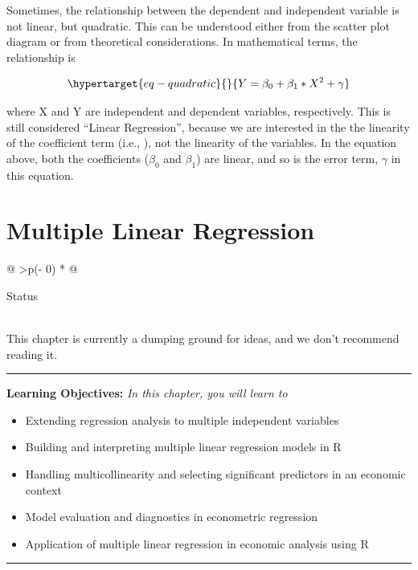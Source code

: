 \documentclass[
  letterpaper,
  paper =a4,
  twoside,
  openright,
  headsepline,
  footsepline,
  listof = totocnumbered,
  chapterprefix = true,
  firstiscover]{scrbook}
\providecommand{\abstractname}{Learning Objectives} %
\newenvironment{objectives}[1]{%
	\hrule
	\vspace{5pt}
	\small\textbf{\abstractname: } 
	\newline
	\vspace{0.1cm}
	\small\emph{#1} %
	\itshape %
}{%
	\vspace{5pt}
	\hrule
	\vspace{0.6cm}
}
\begin{document}
Sometimes, the relationship between the dependent and independent
variable is not linear, but quadratic. This can be understood either
from the scatter plot diagram or from theoretical considerations. In
mathematical terms, the relationship is

\begin{equation}\protect\hypertarget{eq-quadratic}{}{
Y = \beta_0 + \beta_1*X^2 + \gamma
}\label{eq-quadratic}\end{equation}

where X and Y are independent and dependent variables, respectively.
This is still considered ``Linear Regression'', because we are
interested in the the linearity of the coefficient term (i.e., \beta),
not the linearity of the variables. In the equation above, both the
coefficients (\(\beta_0\) and \(\beta_1\)) are linear, and so is the
error term, \(\gamma\) in this equation.


\hypertarget{multiple-linear-regression}{%
\chapter{Multiple Linear Regression}\label{multiple-linear-regression}}

\begin{longtable}[]{@{}
  >{\centering\arraybackslash}p{(\columnwidth - 0\tabcolsep) * }@{}}
\toprule\noalign{}
\begin{minipage}[b]{\linewidth}\centering
Status
\end{minipage} \\
\midrule\noalign{}
\endhead
\bottomrule\noalign{}
\endlastfoot
This chapter is currently a dumping ground for ideas, and we don't
recommend reading it. \\
\end{longtable}

\begin{objectives}{In this chapter, you will learn to}
\begin{itemize}

\item{Extending regression analysis to multiple independent variables}

\item{Building and interpreting multiple linear regression models in R}

\item{Handling multicollinearity and selecting significant predictors in an economic context}

\item{Model evaluation and diagnostics in econometric regression}

\item{Application of multiple linear regression in economic analysis using R}

\end{itemize}

\end{objectives}
\end{document}
